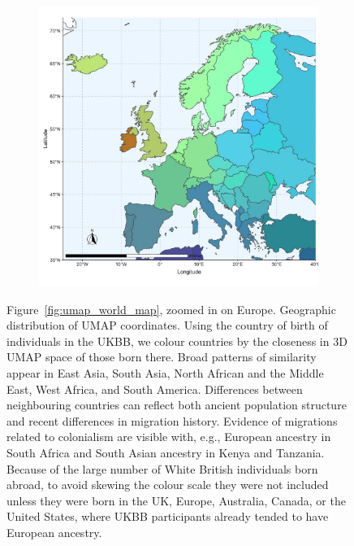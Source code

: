 \documentclass[12pt]{pnas-new}
\begin{document}
\begin{figure}
    \centering
    \begin{subfigure}{\textwidth}
    \includegraphics[width=\textwidth]{images/meanEuroMap.jpg}
    \end{subfigure}
    \caption{Figure~\ref{fig:umap_world_map}, zoomed in on Europe. Geographic distribution of UMAP coordinates. Using the country of birth of individuals in the UKBB, we colour countries by the closeness in 3D UMAP space of those born there. Broad patterns of similarity appear in East Asia, South Asia, North African and the Middle East, West Africa, and South America. Differences between neighbouring countries can reflect both ancient population structure and recent differences in migration history. Evidence of migrations related to colonialism are visible with, e.g., European ancestry in South Africa and South Asian ancestry in Kenya and Tanzania. Because of the large number of White British individuals born abroad, to avoid skewing the colour scale they were not included unless they were born in the UK, Europe, Australia, Canada, or the United States, where UKBB participants already tended to have European ancestry. }
    \label{fig:supp_umap_ukbb_eur}
\end{figure}
\end{document}
